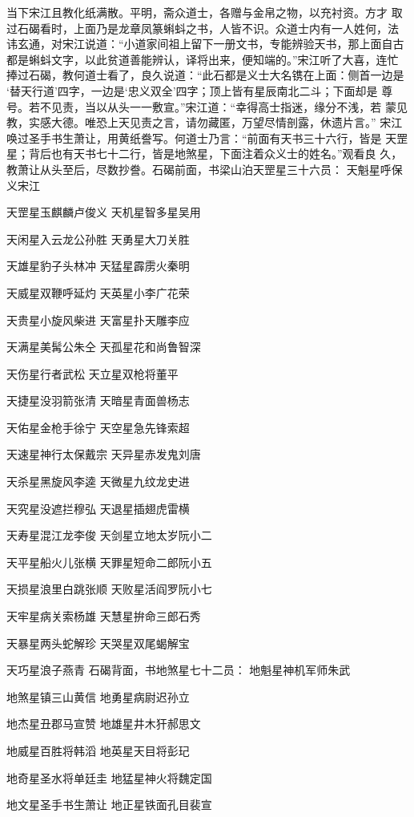 当下宋江且教化纸满散。平明，斋众道士，各赠与金帛之物，以充衬资。方才
取过石碣看时，上面乃是龙章凤篆蝌蚪之书，人皆不识。众道士内有一人姓何，法
讳玄通，对宋江说道：“小道家间祖上留下一册文书，专能辨验天书，那上面自古
都是蝌蚪文字，以此贫道善能辨认，译将出来，便知端的。”宋江听了大喜，连忙
捧过石碣，教何道士看了，良久说道：“此石都是义士大名镌在上面：侧首一边是
‘替天行道’四字，一边是‘忠义双全’四字；顶上皆有星辰南北二斗；下面却是
尊号。若不见责，当以从头一一敷宣。”宋江道：“幸得高士指迷，缘分不浅，若
蒙见教，实感大德。唯恐上天见责之言，请勿藏匿，万望尽情剖露，休遗片言。”
宋江唤过圣手书生萧让，用黄纸誊写。何道士乃言：“前面有天书三十六行，皆是
天罡星；背后也有天书七十二行，皆是地煞星，下面注着众义士的姓名。”观看良
久，教萧让从头至后，尽数抄誊。石碣前面，书梁山泊天罡星三十六员：
天魁星呼保义宋江

天罡星玉麒麟卢俊义
天机星智多星吴用

天闲星入云龙公孙胜
天勇星大刀关胜

天雄星豹子头林冲
天猛星霹雳火秦明

天威星双鞭呼延灼
天英星小李广花荣

天贵星小旋风柴进
天富星扑天雕李应

天满星美髯公朱仝
天孤星花和尚鲁智深

天伤星行者武松
天立星双枪将董平

天捷星没羽箭张清
天暗星青面兽杨志

天佑星金枪手徐宁
天空星急先锋索超

天速星神行太保戴宗
天异星赤发鬼刘唐

天杀星黑旋风李逵
天微星九纹龙史进

天究星没遮拦穆弘
天退星插翅虎雷横

天寿星混江龙李俊
天剑星立地太岁阮小二

天平星船火儿张横
天罪星短命二郎阮小五

天损星浪里白跳张顺
天败星活阎罗阮小七

天牢星病关索杨雄
天慧星拚命三郎石秀

天暴星两头蛇解珍
天哭星双尾蝎解宝

天巧星浪子燕青
石碣背面，书地煞星七十二员：
地魁星神机军师朱武

地煞星镇三山黄信
地勇星病尉迟孙立

地杰星丑郡马宣赞
地雄星井木犴郝思文

地威星百胜将韩滔
地英星天目将彭玘

地奇星圣水将单廷圭
地猛星神火将魏定国

地文星圣手书生萧让
地正星铁面孔目裴宣

